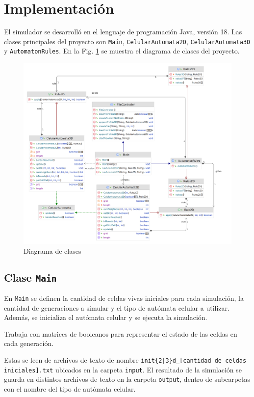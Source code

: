 \section{Implementación}
\label{sec:implementacion}

El simulador se desarrolló en el lenguaje de programación Java, versión 18.
Las clases principales del proyecto son \texttt{Main}, \texttt{CelularAutomata2D}, \texttt{CelularAutomata3D} y \texttt{AutomatonRules}.
En la Fig. {\ref{fig:uml}} se muestra el diagrama de clases del proyecto.

\begin{figure}[H]
    \centering
    \includegraphics[width=1\textwidth]{Images/uml_light}
    \caption{Diagrama de clases}
    \label{fig:uml}
\end{figure}

\subsection{Clase \texttt{Main}}
\label{subsec:main}
En \texttt{Main} se definen la cantidad de celdas vivas iniciales para cada simulación, la cantidad de generaciones a simular y el tipo de autómata celular a utilizar.
Además, se inicializa el autómata celular y se ejecuta la simulación.

Trabaja con matrices de booleanos para representar el estado de las celdas en cada generación.

Estas se leen de archivos de texto de nombre \texttt{init\{2|3\}d\_[cantidad de celdas iniciales].txt} ubicados en la carpeta \texttt{input}.
El resultado de la simulación se guarda en distintos archivos de texto en la carpeta \texttt{output}, dentro de subcarpetas con el nombre del tipo de autómata celular.

